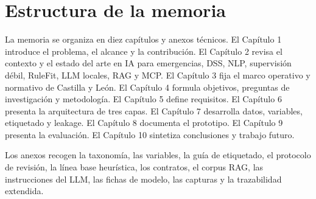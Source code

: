 \section{Estructura de la memoria}

La memoria se organiza en diez capítulos y anexos técnicos. El Capítulo 1 introduce el problema, el alcance y la contribución. El Capítulo 2 revisa el contexto y el estado del arte en IA para emergencias, DSS, NLP, supervisión débil, RuleFit, LLM locales, RAG y MCP. El Capítulo 3 fija el marco operativo y normativo de Castilla y León. El Capítulo 4 formula objetivos, preguntas de investigación y metodología. El Capítulo 5 define requisitos. El Capítulo 6 presenta la arquitectura de tres capas. El Capítulo 7 desarrolla datos, variables, etiquetado y leakage. El Capítulo 8 documenta el prototipo. El Capítulo 9 presenta la evaluación. El Capítulo 10 sintetiza conclusiones y trabajo futuro.

Los anexos recogen la taxonomía, las variables, la guía de etiquetado, el protocolo de revisión, la línea base heurística, los contratos, el corpus RAG, las instrucciones del LLM, las fichas de modelo, las capturas y la trazabilidad extendida.

